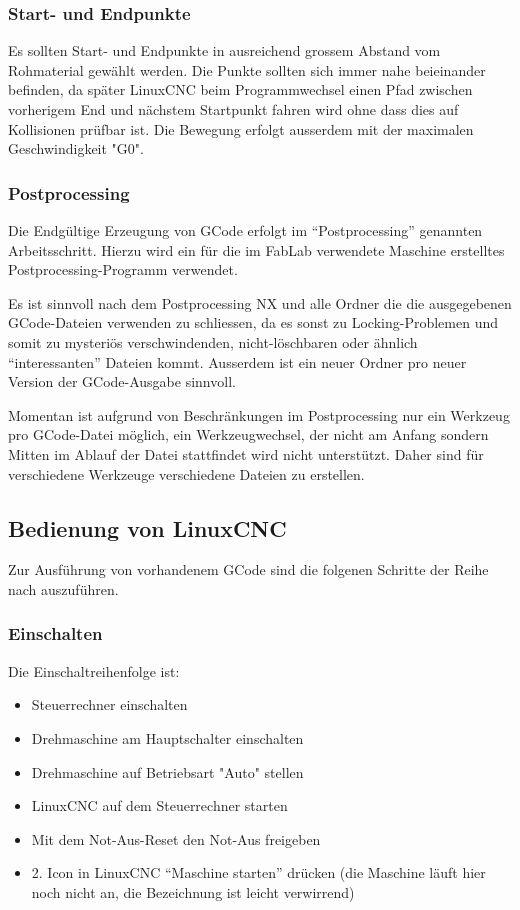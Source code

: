 \documentclass{\basedir/fablab-document}
\begin{document}
\subsubsection{Start- und Endpunkte}

Es sollten Start- und Endpunkte in ausreichend grossem Abstand vom Rohmaterial gewählt werden. Die Punkte sollten sich immer nahe beieinander befinden, da später LinuxCNC beim Programmwechsel einen Pfad zwischen vorherigem End und nächstem Startpunkt fahren wird ohne dass dies auf Kollisionen prüfbar ist.
Die Bewegung erfolgt ausserdem mit der maximalen Geschwindigkeit "G0".

\subsubsection{Postprocessing}

Die Endgültige Erzeugung von GCode erfolgt im "`Postprocessing"' genannten Arbeitsschritt. Hierzu wird ein für die im FabLab verwendete Maschine erstelltes Postprocessing-Programm verwendet. 

Es ist sinnvoll nach dem Postprocessing NX und alle Ordner die die ausgegebenen
GCode-Dateien verwenden zu schliessen, da es sonst zu Locking-Problemen und
somit zu mysteriös verschwindenden, nicht-löschbaren oder ähnlich
"`interessanten"' Dateien kommt. Ausserdem ist ein neuer Ordner pro neuer
Version der GCode-Ausgabe sinnvoll.

Momentan ist aufgrund von Beschränkungen im Postprocessing nur ein Werkzeug pro GCode-Datei möglich, ein Werkzeugwechsel, der nicht am Anfang sondern Mitten im Ablauf der Datei stattfindet wird nicht unterstützt. Daher sind für verschiedene Werkzeuge verschiedene Dateien zu erstellen.

\subsection{Bedienung von LinuxCNC}

Zur Ausführung von vorhandenem GCode sind die folgenen Schritte der Reihe nach auszuführen.

\subsubsection{Einschalten}
Die Einschaltreihenfolge ist:
\begin{itemize}
	\item Steuerrechner einschalten
	\item Drehmaschine am Hauptschalter einschalten
	\item Drehmaschine auf Betriebsart "Auto" stellen
	\item LinuxCNC auf dem Steuerrechner starten
	\item Mit dem Not-Aus-Reset den Not-Aus freigeben
	\item 2. Icon in LinuxCNC "`Maschine starten"' drücken (die Maschine läuft hier noch nicht an, die Bezeichnung ist leicht verwirrend)
\end{itemize}
\end{document}
